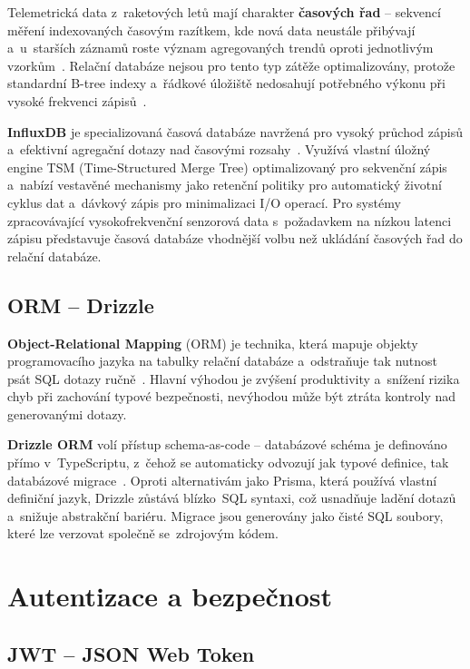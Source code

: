 Telemetrická data z~raketových letů mají charakter \textbf{časových řad} -- sekvencí měření indexovaných časovým razítkem, kde nová data neustále přibývají a~u~starších záznamů roste význam agregovaných trendů oproti jednotlivým vzorkům~\cite{kaknjo2019lowcost}. Relační databáze nejsou pro tento typ zátěže optimalizovány, protože standardní B-tree indexy a~řádkové úložiště nedosahují potřebného výkonu při vysoké frekvenci zápisů~\cite{grzesik2020tsdb}.

\textbf{InfluxDB} je specializovaná časová databáze navržená pro vysoký průchod zápisů a~efektivní agregační dotazy nad časovými rozsahy~\cite{influxdb2024docs}. Využívá vlastní úložný engine TSM (Time-Structured Merge Tree) optimalizovaný pro sekvenční zápis a~nabízí vestavěné mechanismy jako retenční politiky pro automatický životní cyklus dat a~dávkový zápis pro minimalizaci I/O operací. Pro systémy zpracovávající vysokofrekvenční senzorová data s~požadavkem na nízkou latenci zápisu představuje časová databáze vhodnější volbu než ukládání časových řad do relační databáze.

\subsection{ORM -- Drizzle}

\textbf{Object-Relational Mapping} (ORM) je technika, která mapuje objekty programovacího jazyka na tabulky relační databáze a~odstraňuje tak nutnost psát SQL dotazy ručně~\cite{torres2017orm}. Hlavní výhodou je zvýšení produktivity a~snížení rizika chyb při zachování typové bezpečnosti, nevýhodou může být ztráta kontroly nad generovanými dotazy.

\textbf{Drizzle ORM} volí přístup schema-as-code -- databázové schéma je definováno přímo v~TypeScriptu, z~čehož se automaticky odvozují jak typové definice, tak databázové migrace~\cite{drizzle2024docs}. Oproti alternativám jako Prisma, která používá vlastní definiční jazyk, Drizzle zůstává blízko~SQL syntaxi, což usnadňuje ladění dotazů a~snižuje abstrakční bariéru. Migrace jsou generovány jako čisté SQL soubory, které lze verzovat společně se~zdrojovým kódem.

\section{Autentizace a bezpečnost}

\subsection{JWT -- JSON Web Token}

